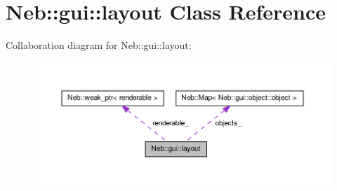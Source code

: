 \hypertarget{classNeb_1_1gui_1_1layout}{\section{\-Neb\-:\-:gui\-:\-:layout \-Class \-Reference}
\label{classNeb_1_1gui_1_1layout}
}


\-Collaboration diagram for \-Neb\-:\-:gui\-:\-:layout\-:\nopagebreak
\begin{figure}[H]
\begin{center}
\leavevmode
\includegraphics[width=350pt]{classNeb_1_1gui_1_1layout__coll__graph}
\end{center}
\end{figure}
